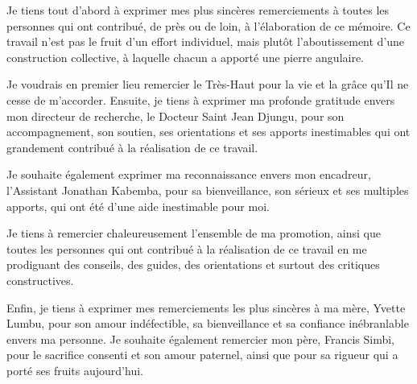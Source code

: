 Je tiens tout d'abord à exprimer mes plus sincères remerciements à toutes les personnes qui ont contribué, de près ou de loin, à l'élaboration de ce mémoire. Ce travail n'est pas le fruit d'un effort individuel, mais plutôt l'aboutissement d'une construction collective, à laquelle chacun a apporté une pierre angulaire.

Je voudrais en premier lieu remercier le Très-Haut pour la vie et la grâce qu'Il ne cesse de m'accorder. Ensuite, je tiens à exprimer ma profonde gratitude envers mon directeur de recherche, le Docteur Saint Jean Djungu, pour son accompagnement, son soutien, ses orientations et ses apports inestimables qui ont grandement contribué à la réalisation de ce travail.

Je souhaite également exprimer ma reconnaissance envers mon encadreur, l'Assistant Jonathan Kabemba, pour sa bienveillance, son sérieux et ses multiples apports, qui ont été d'une aide inestimable pour moi.

Je tiens à remercier chaleureusement l'ensemble de ma promotion, ainsi que toutes les personnes qui ont contribué à la réalisation de ce travail en me prodiguant des conseils, des guides, des orientations et surtout des critiques constructives.

Enfin, je tiens à exprimer mes remerciements les plus sincères à ma mère, Yvette Lumbu, pour son amour indéfectible, sa bienveillance et sa confiance inébranlable envers ma personne. Je souhaite également remercier mon père, Francis Simbi, pour le sacrifice consenti et son amour paternel, ainsi que pour sa rigueur qui a porté ses fruits aujourd'hui.